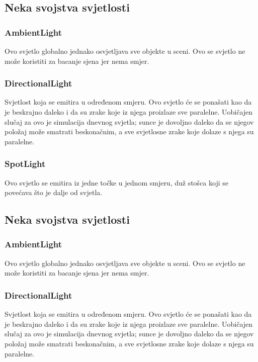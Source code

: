 \documentclass[a4paper,12pt]{article}
\begin{document}
\pagebreak
\subsection{Neka svojstva svjetlosti}
\subsubsection{AmbientLight}
\hspace{10mm} Ovo svjetlo globalno jednako osvjetljava sve objekte u sceni.
Ovo se svjetlo ne može koristiti za bacanje sjena jer nema smjer.

\subsubsection{DirectionalLight}
\hspace{10mm} Svjetlost koja se emitira u određenom smjeru. Ovo svjetlo će se ponašati kao da je beskrajno daleko i da su zrake koje iz njega proizlaze sve paralelne. Uobičajen slučaj za ovo je simulacija dnevnog svjetla; sunce je dovoljno daleko da se njegov položaj može smatrati beskonačnim, a sve svjetlosne zrake koje dolaze s njega su paralelne.

\subsubsection{SpotLight}
\hspace{10mm} Ovo svjetlo se emitira iz jedne točke u jednom smjeru, duž stošca koji se povećava što je dalje od svjetla.

\pagebreak
\subsection{Neka svojstva svjetlosti}
\subsubsection{AmbientLight}
\hspace{10mm} Ovo svjetlo globalno jednako osvjetljava sve objekte u sceni.
Ovo se svjetlo ne može koristiti za bacanje sjena jer nema smjer.

\subsubsection{DirectionalLight}
\hspace{10mm} Svjetlost koja se emitira u određenom smjeru. Ovo svjetlo će se ponašati kao da je beskrajno daleko i da su zrake koje iz njega proizlaze sve paralelne. Uobičajen slučaj za ovo je simulacija dnevnog svjetla; sunce je dovoljno daleko da se njegov položaj može smatrati beskonačnim, a sve svjetlosne zrake koje dolaze s njega su paralelne.
\end{document}

